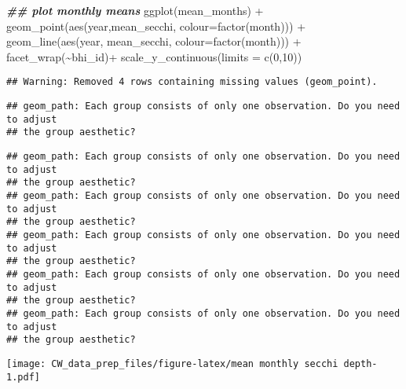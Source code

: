 \documentclass[
]{article}
\newenvironment{Shaded}{\begin{snugshade}}{\end{snugshade}}
\newcommand{\AttributeTok}[1]{\textcolor[rgb]{0.77,0.63,0.00}{#1}}
\newcommand{\DecValTok}[1]{\textcolor[rgb]{0.00,0.00,0.81}{#1}}
\newcommand{\DocumentationTok}[1]{\textcolor[rgb]{0.56,0.35,0.01}{\textbf{\textit{#1}}}}
\newcommand{\FunctionTok}[1]{\textcolor[rgb]{0.00,0.00,0.00}{#1}}
\newcommand{\NormalTok}[1]{#1}
\newcommand{\SpecialCharTok}[1]{\textcolor[rgb]{0.00,0.00,0.00}{#1}}
\begin{document}
\begin{Shaded}
\begin{Highlighting}[]
\DocumentationTok{\#\# plot monthly means }
\FunctionTok{ggplot}\NormalTok{(mean\_months) }\SpecialCharTok{+} \FunctionTok{geom\_point}\NormalTok{(}\FunctionTok{aes}\NormalTok{(year,mean\_secchi, }\AttributeTok{colour=}\FunctionTok{factor}\NormalTok{(month))) }\SpecialCharTok{+}
  \FunctionTok{geom\_line}\NormalTok{(}\FunctionTok{aes}\NormalTok{(year, mean\_secchi, }\AttributeTok{colour=}\FunctionTok{factor}\NormalTok{(month))) }\SpecialCharTok{+}
  \FunctionTok{facet\_wrap}\NormalTok{(}\SpecialCharTok{\textasciitilde{}}\NormalTok{bhi\_id)}\SpecialCharTok{+}
  \FunctionTok{scale\_y\_continuous}\NormalTok{(}\AttributeTok{limits =} \FunctionTok{c}\NormalTok{(}\DecValTok{0}\NormalTok{,}\DecValTok{10}\NormalTok{))}
\end{Highlighting}
\end{Shaded}

\begin{verbatim}
## Warning: Removed 4 rows containing missing values (geom_point).
\end{verbatim}

\begin{verbatim}
## geom_path: Each group consists of only one observation. Do you need to adjust
## the group aesthetic?
\end{verbatim}

\begin{verbatim}
## geom_path: Each group consists of only one observation. Do you need to adjust
## the group aesthetic?
## geom_path: Each group consists of only one observation. Do you need to adjust
## the group aesthetic?
## geom_path: Each group consists of only one observation. Do you need to adjust
## the group aesthetic?
## geom_path: Each group consists of only one observation. Do you need to adjust
## the group aesthetic?
## geom_path: Each group consists of only one observation. Do you need to adjust
## the group aesthetic?
\end{verbatim}

\texttt{[image: CW\_data\_prep\_files/figure-latex/mean monthly secchi depth-1.pdf]}
\end{document}
